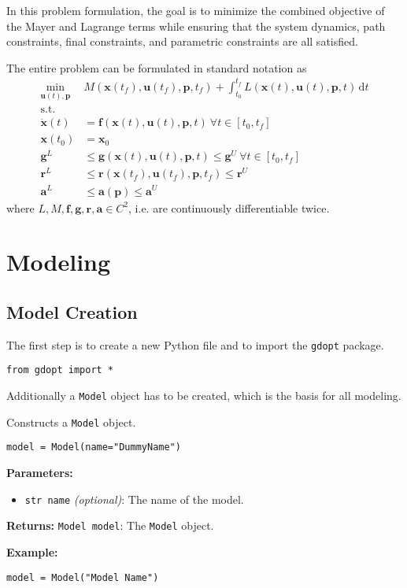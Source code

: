 \documentclass[12pt]{article}
\renewcommand{\v}{\bm}
\begin{document}
In this problem formulation, the goal is to minimize the combined objective of
the Mayer and Lagrange terms while ensuring that the system dynamics, path
constraints, final constraints, and parametric constraints are all satisfied.

The entire problem can be formulated in standard notation as
\begin{align*}
	\min_{\v{u}(t), \v{p}} ~ & M(\v{x}(t_f), \v{u}(t_f),
	\v{p}, t_f) + \int_{t_0}^{t_f} L(\v{x}(t), \v{u}(t), \v{p}, t)
	\, \mathrm{d}t
	\\
	\text{s.t.}              &
	\\
	\dot{\v{x}}(t)           & = \v{f}(\v{x}(t), \v{u}(t), \v{p},
	t)\
	\forall t \in [t_0, t_f]
	\\
	\v{x}(t_0)               & = \v{x}_0
	\\
	\v{g}^{L}                & \leq \v{g}(\v{x}(t), \v{u}(t),
	\v{p}, t)
	\leq \v{g}^{U}\ \forall t \in [t_0, t_f]
	\\
	\v{r}^{L}                & \leq \v{r}(\v{x}(t_f), \v{u}(t_f),
	\v{p},
	t_f) \leq \v{r}^{U}
	\\
	\v{a}^{L}                & \leq \v{a}(\v{p}) \leq \v{a}^{U}
\end{align*}
where $L, M, \v{f}, \v{g}, \v{r}, \v{a} \in C^2$, i.e. are continuously
differentiable twice.

\section{Modeling}

\subsection{Model Creation}
The first step is to create a new Python file and to import the
\texttt{gdopt} package.
\begin{lstlisting}
from gdopt import *
	\end{lstlisting}

Additionally a \texttt{Model} object has to be created, which is the basis for
all modeling.

\begin{mdframed}[backgroundcolor=gray!10, roundcorner=10pt, linewidth=1pt]

	Constructs a \texttt{Model} object.

	\begin{lstlisting}
model = Model(name="DummyName")
	\end{lstlisting}\label{Model}

	\textbf{Parameters:}
	\begin{itemize}
		\item \texttt{str name} \emph{(optional)}: The name of the
		      model.
	\end{itemize}

	\textbf{Returns:}
	\texttt{Model model}: The \texttt{Model} object.

	\textbf{Example:}
	\begin{lstlisting}
model = Model("Model Name")
	\end{lstlisting}
\end{mdframed}
\end{document}

